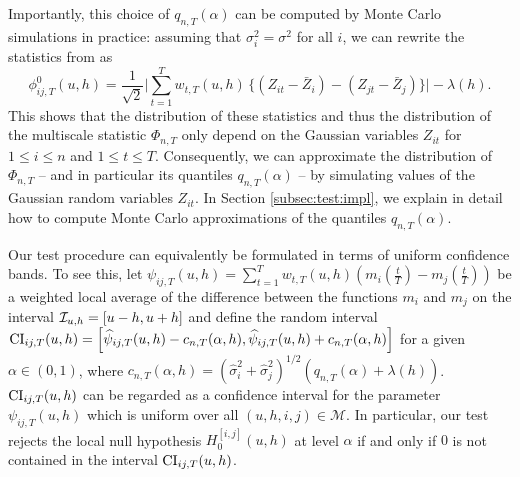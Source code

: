 \documentclass[12pt]{article}
\makeatletter
\renewcommand{\eqref}[1]{\tagform@{\ref{#1}}}
\makeatother
\begin{document}
Importantly, this choice of $q_{n,T}(\alpha)$ can be computed by Monte Carlo simulations in practice: assuming that $\sigma_i^2 = \sigma^2$ for all $i$, we can rewrite the statistics from \eqref{eq:phi_zero_ij} as
\[\phi^0_{ij, T}(u, h) = \frac{1}{\sqrt{2}} \Big|\sum\limits_{t=1}^T w_{t,T}(u, h) \, \big\{ (Z_{it} - \bar{Z}_i) - (Z_{jt} - \bar{Z}_j) \big\}\Big| - \lambda(h). \] 
This shows that the distribution of these statistics and thus the distribution of the multiscale statistic $\Phi_{n,T}$ only depend on the Gaussian variables $Z_{it}$ for $1 \le i \le n$ and $1 \le t \le T$. Consequently, we can approximate the distribution of $\Phi_{n,T}$ -- and in particular its quantiles $q_{n,T}(\alpha)$ -- by simulating values of the Gaussian random variables $Z_{it}$. In Section \ref{subsec:test:impl}, we explain in detail how to compute Monte Carlo approximations of the quantiles $q_{n,T}(\alpha)$. 


\begin{remark}
Our test procedure can equivalently be formulated in terms of uniform confidence bands. To see this, let $\psi_{ij,T}(u,h) = \sum_{t=1}^T w_{t,T}(u,h) (m_i(\frac{t}{T}) - m_j(\frac{t}{T}))$ be a weighted local average of the difference between the functions $m_i$ and $m_j$ on the interval $\mathcal{I}_{u, h} = [u-h,u+h]$ and define the random interval
$\textnormal{CI}_{ij,T}(u,h) = \Big[ \widehat{\psi}_{ij,T}(u,h) - c_{n,T}(\alpha,h), \widehat{\psi}_{ij,T}(u,h) + c_{n,T}(\alpha,h) \Big]$
for a given $\alpha \in (0,1)$, where $c_{n,T}(\alpha,h) = ( \widehat{\sigma}_i^2 + \widehat{\sigma}_j^2)^{1/2} (q_{n,T}(\alpha) + \lambda(h))$. $\textnormal{CI}_{ij,T}(u,h)$ can be regarded as a confidence interval for the parameter $\psi_{ij,T}(u,h)$ which is uniform over all $(u,h,i,j) \in \mathcal{M}$. In particular, our test rejects the local null hypothesis $H_0^{[i, j]}(u, h)$ at level $\alpha$ if and only if $0$ is not contained in the interval $\textnormal{CI}_{ij,T}(u,h)$. 
\end{remark}
\end{document}
